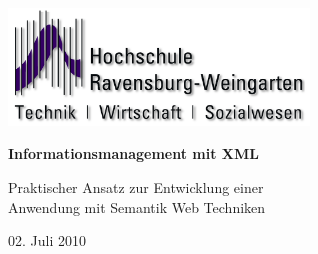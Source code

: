 % 
% 
% 
% 

\begin{titlepage}
	\areaset[0cm]{21cm}{29cm}
	\vspace*{2cm}
	\begin{center}
		\includegraphics[width=8.0cm]{images/HS-Logo} \\
		 \vspace{2cm}

		\Huge
		\textbf{Informationsmanagement mit XML} \\

		\vspace{1.5cm}

		\huge
		Praktischer Ansatz zur Entwicklung einer \\ Anwendung mit Semantik Web Techniken\\
		
		\large
		\vspace{1cm}
		
		\small
		02. Juli 2010 \\		

		


\end{center}
\end{titlepage}
